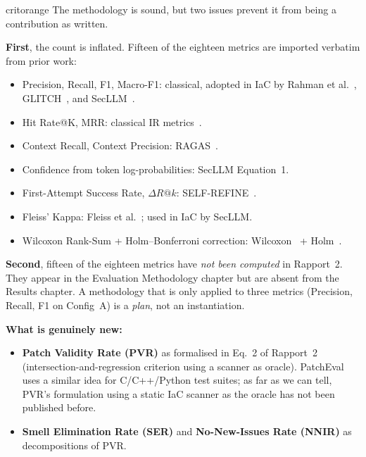\documentclass[11pt, a4paper]{report}
\begin{document}
\begin{gradebox}{critorange}
The methodology is sound, but two issues prevent it from being a
contribution as written.
\end{gradebox}

\textbf{First}, the count is inflated. Fifteen of the eighteen metrics are
imported verbatim from prior work:

\begin{itemize}
  \item Precision, Recall, F1, Macro-F1: classical, adopted in IaC by
        Rahman et al.~\citep{rahman2019seven}, GLITCH~\citep{saavedra2022glitch},
        and SecLLM~\citep{devito2025secllm}.
  \item Hit Rate@K, MRR: classical IR metrics~\citep{manning2008ir}.
  \item Context Recall, Context Precision: RAGAS~\citep{es2024ragas}.
  \item Confidence from token log-probabilities: SecLLM Equation~1.
  \item First-Attempt Success Rate, $\Delta R@k$: SELF-REFINE~\citep{madaan2023selfrefine}.
  \item Fleiss' Kappa: Fleiss et al.~\citep{fleiss2013statistical}; used
        in IaC by SecLLM.
  \item Wilcoxon Rank-Sum + Holm--Bonferroni correction:
        Wilcoxon~\citep{wilcoxon1945} + Holm~\citep{holm1979}.
\end{itemize}

\textbf{Second}, fifteen of the eighteen metrics have \emph{not been
computed} in Rapport~2. They appear in the Evaluation Methodology chapter
but are absent from the Results chapter. A methodology that is only
applied to three metrics (Precision, Recall, F1 on Config~A) is a
\emph{plan}, not an instantiation.

\textbf{What is genuinely new:}

\begin{itemize}
  \item \textbf{Patch Validity Rate (PVR)} as formalised in Eq.~2 of
        Rapport~2 (intersection-and-regression criterion using a scanner
        as oracle). PatchEval~\citep{lyu2024patcheval} uses a similar
        idea for C/C++/Python test suites; as far as we can tell, PVR's
        formulation using a static IaC scanner as the oracle has not
        been published before.
  \item \textbf{Smell Elimination Rate (SER)} and
        \textbf{No-New-Issues Rate (NNIR)} as decompositions of PVR.
\end{itemize}
\end{document}
